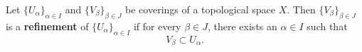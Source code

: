 Let $\{U_\alpha\}_{\alpha \in I}$ and $\{V_\beta\}_{\beta \in J}$ be coverings of a topological space $X$. Then $\{V_\beta\}_{\beta \in J}$ is a \textbf{refinement} of $\{U_\alpha\}_{\alpha \in I}$ if for every $\beta \in J$, there exists an $\alpha \in I$ such that
$$V_\beta \subset U_\alpha.$$
